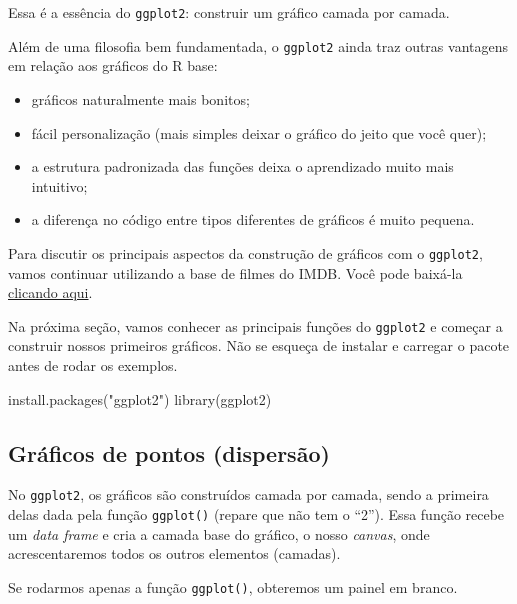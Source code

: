 \documentclass[
]{book}
\newenvironment{Shaded}{\begin{snugshade}}{\end{snugshade}}
\newcommand{\FunctionTok}[1]{\textcolor[rgb]{0.00,0.00,0.00}{#1}}
\newcommand{\NormalTok}[1]{#1}
\newcommand{\StringTok}[1]{\textcolor[rgb]{0.31,0.60,0.02}{#1}}
\providecommand{\tightlist}{%
  \setlength{\itemsep}{0pt}\setlength{\parskip}{0pt}}
\begin{document}
Essa é a essência do \texttt{ggplot2}: construir um gráfico camada por camada.

Além de uma filosofia bem fundamentada, o \texttt{ggplot2} ainda traz outras vantagens em relação aos gráficos do R base:

\begin{itemize}
\tightlist
\item
  gráficos naturalmente mais bonitos;
\item
  fácil personalização (mais simples deixar o gráfico do jeito que você quer);
\item
  a estrutura padronizada das funções deixa o aprendizado muito mais intuitivo;
\item
  a diferença no código entre tipos diferentes de gráficos é muito pequena.
\end{itemize}

Para discutir os principais aspectos da construção de gráficos com o \texttt{ggplot2}, vamos continuar utilizando a base de filmes do IMDB. Você pode baixá-la \href{https://github.com/curso-r/livro-material/raw/master/assets/data/imdb.rds}{clicando aqui}.

Na próxima seção, vamos conhecer as principais funções do \texttt{ggplot2} e começar a construir nossos primeiros gráficos. Não se esqueça de instalar e carregar o pacote antes de rodar os exemplos.

\begin{Shaded}
\begin{Highlighting}[]
\FunctionTok{install.packages}\NormalTok{(}\StringTok{"ggplot2"}\NormalTok{)}
\FunctionTok{library}\NormalTok{(ggplot2)}
\end{Highlighting}
\end{Shaded}

\hypertarget{gruxe1ficos-de-pontos-dispersuxe3o}{%
\subsection{Gráficos de pontos (dispersão)}\label{gruxe1ficos-de-pontos-dispersuxe3o}}

No \texttt{ggplot2}, os gráficos são construídos camada por camada, sendo a primeira delas dada pela função \texttt{ggplot()} (repare que não tem o ``2''). Essa função recebe um \emph{data frame} e cria a camada base do gráfico, o nosso \emph{canvas}, onde acrescentaremos todos os outros elementos (camadas).

Se rodarmos apenas a função \texttt{ggplot()}, obteremos um painel em branco.
\end{document}
